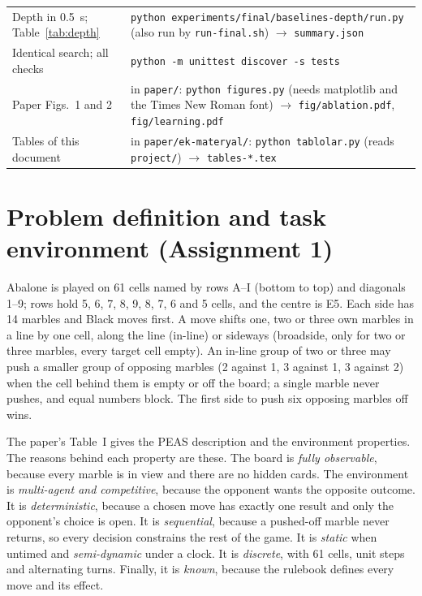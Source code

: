\documentclass[a4paper,10pt]{article}
\begin{document}
\begin{table}[!htbp]
\begin{tabular}{@{}>{\raggedright\arraybackslash}p{3.3cm}>{\raggedright\arraybackslash}p{13.0cm}@{}}
Depth in 0.5~s; Table~\ref{tab:depth} & \texttt{python experiments/final/baselines-depth/run.py} (also run by \texttt{run-final.sh}) $\rightarrow$ \texttt{summary.json} \\
Identical search; all checks & \texttt{python -m unittest discover -s tests} \\
Paper Figs.~1 and 2 & in \texttt{paper/}: \texttt{python figures.py} (needs matplotlib and the Times New Roman font) $\rightarrow$ \texttt{fig/ablation.pdf}, \texttt{fig/learning.pdf} \\
Tables of this document & in \texttt{paper/ek-materyal/}: \texttt{python tablolar.py} (reads \texttt{project/}) $\rightarrow$ \texttt{tables-*.tex} \\
\bottomrule
\end{tabular}
\end{table}

\section{Problem definition and task environment (Assignment 1)}

Abalone is played on 61 cells named by rows A--I (bottom to top) and diagonals 1--9; rows hold 5, 6, 7, 8, 9, 8,
7, 6 and 5 cells, and the centre is E5. Each side has 14 marbles and Black moves first. A move shifts one, two or
three own marbles in a line by one cell, along the line (in-line) or sideways (broadside, only for two or three
marbles, every target cell empty). An in-line group of two or three may push a smaller group of opposing marbles
(2 against 1, 3 against 1, 3 against 2) when the cell behind them is empty or off the board; a single marble never
pushes, and equal numbers block. The first side to push six opposing marbles off wins.

The paper's Table~I gives the PEAS description and the environment properties. The reasons behind each property are
these. The board is \emph{fully observable}, because every marble is in view and there are no hidden cards. The
environment is \emph{multi-agent and competitive}, because the opponent wants the opposite outcome. It is
\emph{deterministic}, because a chosen move has exactly one result and only the opponent's choice is open. It is
\emph{sequential}, because a pushed-off marble never returns, so every decision constrains the rest of the game.
It is \emph{static} when untimed and \emph{semi-dynamic} under a clock. It is \emph{discrete}, with 61 cells, unit
steps and alternating turns. Finally, it is \emph{known}, because the rulebook defines every move and its effect.
\end{document}
